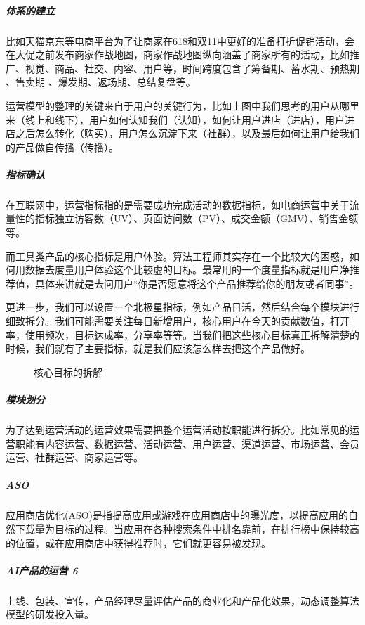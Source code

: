 \documentclass[letterpaper,10pt,english]{sphinxmanual}
\begin{document}
\subparagraph{体系的建立}
\label{\detokenize{chapter_idea/GTM:id14}}
比如天猫京东等电商平台为了让商家在618和双11中更好的准备打折促销活动，会在大促之前发布商家作战地图，商家作战地图纵向涵盖了商家所有的活动，比如推广、视觉、商品、社交、内容、用户等，时间跨度包含了筹备期、蓄水期、预热期
、售卖期 、爆发期、返场期、总结复盘等。

运营模型的整理的关键来自于用户的关键行为，比如上图中我们思考的用户从哪里来（线上和线下），用户如何认知我们（认知），如何让用户进店（进店），用户进店之后怎么转化（购买），用户怎么沉淀下来（社群），以及最后如何让用户给我们的产品做自传播（传播）。


\subparagraph{指标确认}
\label{\detokenize{chapter_idea/GTM:id15}}
在互联网中，运营指标指的是需要成功完成活动的数据指标，如电商运营中关于流量性的指标独立访客数（UV）、页面访问数（PV）、成交金额（GMV）、销售金额等。

而工具类产品的核心指标是用户体验。算法工程师其实存在一个比较大的困惑，如何用数据去度量用户体验这个比较虚的目标。最常用的一个度量指标就是用户净推荐值，具体来讲就是去问用户“你是否愿意将这个产品推荐给你的朋友或者同事”。

更进一步，我们可以设置一个北极星指标，例如产品日活，然后结合每个模块进行细致拆分。我们可能需要关注每日新增用户，核心用户在今天的贡献数值，打开率，使用频次，目标达成率，分享率等等。当我们把这些核心目标真正拆解清楚的时候，我们就有了主要指标，就是我们应该怎么样去把这个产品做好。

\begin{figure}[H]
\centering
\capstart

\noindent{}
\caption{核心目标的拆解}\label{\detokenize{chapter_idea/GTM:id22}}\end{figure}


\subparagraph{模块划分}
\label{\detokenize{chapter_idea/GTM:id16}}
为了达到运营活动的运营效果需要把整个运营活动按职能进行拆分。比如常见的运营职能有内容运营、数据运营、活动运营、用户运营、渠道运营、市场运营、会员运营、社群运营、商家运营等。


\subparagraph{ASO}
\label{\detokenize{chapter_idea/GTM:aso}}
应用商店优化(ASO)是指提高应用或游戏在应用商店中的曝光度，以提高应用的自然下载量为目标的过程。当应用在各种搜索条件中排名靠前，在排行榜中保持较高的位置，或在应用商店中获得推荐时，它们就更容易被发现。


\subparagraph{AI产品的运营 6\sphinxfootnotemark[472]}
\label{\detokenize{chapter_idea/GTM:ai-6}}%
\begin{footnotetext}[472]\sphinxAtStartFootnote
{}
%
\end{footnotetext}\ignorespaces 
上线、包装、宣传，产品经理尽量评估产品的商业化和产品化效果，动态调整算法模型的研发投入量。
\end{document}
